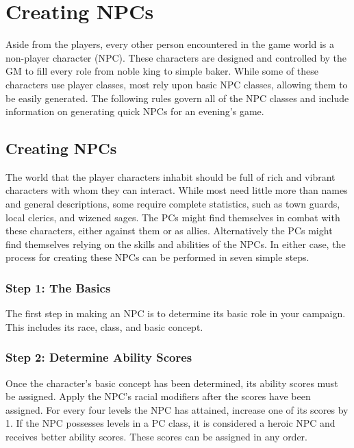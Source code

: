 \chapter{Creating NPCs}

Aside from the players, every other person encountered in the game world is a non-player character (NPC). These characters are
designed and controlled by the GM to fill every role from noble king to simple baker.
While some of these characters use player classes, most
rely upon basic NPC classes, allowing them to be easily
generated. The following rules govern all of the NPC
classes and include information on generating quick
NPCs for an evening's game.




\section{Creating NPCs}

\label{f0}				
The world that the player characters inhabit should be full of rich and vibrant characters with whom they can interact. While most need little more than names and general descriptions, some require complete statistics, such as town guards, local clerics, and wizened sages. The PCs might find themselves in combat with these characters, either against them or as allies. Alternatively the PCs might find themselves relying on the skills and abilities of the NPCs. In either case, the process for creating these NPCs can be performed in seven simple steps.
				
\subsection{Step 1: The Basics}

				
The first step in making an NPC is to determine its basic role in your campaign. This includes its race, class, and basic concept.
				
\subsection{Step 2: Determine Ability Scores}

				
Once the character's basic concept has been determined, its ability scores must be assigned. Apply the NPC's racial modifiers after the scores have been assigned. For every four levels the NPC has attained, increase one of its scores by 1. If the NPC possesses levels in a PC class, it is considered a heroic NPC and receives better ability scores. These scores can be assigned in any order.
				
